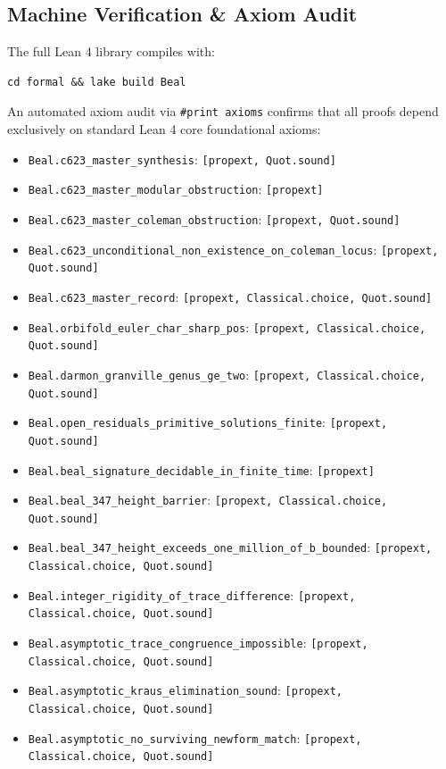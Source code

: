 \documentclass[11pt,reqno]{amsart}
\theoremstyle{definition}
\theoremstyle{remark}
\numberwithin{equation}{section}
\begin{document}
\subsection{Machine Verification \& Axiom Audit}
The full Lean 4 library compiles with:
\begin{verbatim}
cd formal && lake build Beal
\end{verbatim}
An automated axiom audit via \texttt{\#print axioms} confirms that all proofs depend exclusively on standard Lean 4 core foundational axioms:
\begin{itemize}
    \item \texttt{Beal.c623\_master\_synthesis}: \texttt{[propext, Quot.sound]}
    \item \texttt{Beal.c623\_master\_modular\_obstruction}: \texttt{[propext]}
    \item \texttt{Beal.c623\_master\_coleman\_obstruction}: \texttt{[propext, Quot.sound]}
    \item \texttt{Beal.c623\_unconditional\_non\_existence\_on\_coleman\_locus}: \texttt{[propext, Quot.sound]}
    \item \texttt{Beal.c623\_master\_record}: \texttt{[propext, Classical.choice, Quot.sound]}
    \item \texttt{Beal.orbifold\_euler\_char\_sharp\_pos}: \texttt{[propext, Classical.choice, Quot.sound]}
    \item \texttt{Beal.darmon\_granville\_genus\_ge\_two}: \texttt{[propext, Classical.choice, Quot.sound]}
    \item \texttt{Beal.open\_residuals\_primitive\_solutions\_finite}: \texttt{[propext, Quot.sound]}
    \item \texttt{Beal.beal\_signature\_decidable\_in\_finite\_time}: \texttt{[propext]}
    \item \texttt{Beal.beal\_347\_height\_barrier}: \texttt{[propext, Classical.choice, Quot.sound]}
    \item \texttt{Beal.beal\_347\_height\_exceeds\_one\_million\_of\_b\_bounded}: \texttt{[propext, Classical.choice, Quot.sound]}
    \item \texttt{Beal.integer\_rigidity\_of\_trace\_difference}: \texttt{[propext, Classical.choice, Quot.sound]}
    \item \texttt{Beal.asymptotic\_trace\_congruence\_impossible}: \texttt{[propext, Classical.choice, Quot.sound]}
    \item \texttt{Beal.asymptotic\_kraus\_elimination\_sound}: \texttt{[propext, Classical.choice, Quot.sound]}
    \item \texttt{Beal.asymptotic\_no\_surviving\_newform\_match}: \texttt{[propext, Classical.choice, Quot.sound]}

\end{itemize}
\end{document}
